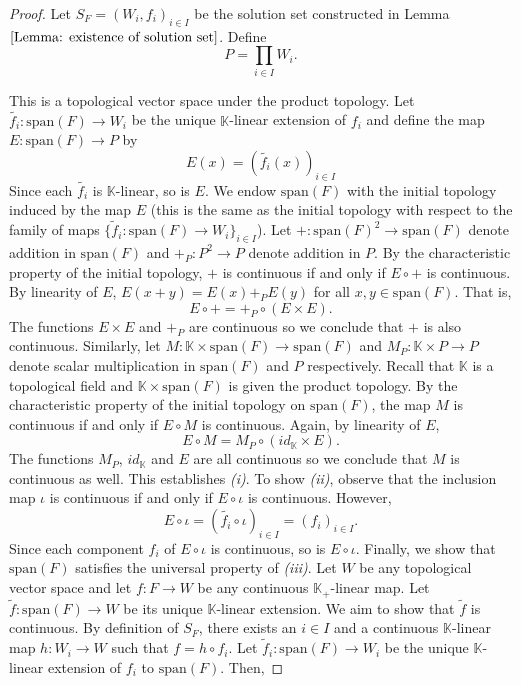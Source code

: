 \documentclass[a4paper,11pt]{article}
\numberwithin{equation}{section}
\theoremstyle{definition}
\theoremstyle{plain}
\newcommand{\spn}{\mathrm{span}}
\begin{document}
\begin{proof}
    Let $S_{F} = (W_{i}, f_{i})_{i \in I}$ be the solution set constructed in Lemma $\ref{Lemma: existence of solution set}$. Define 
    $$P = \prod_{i \in I}W_{i}.$$
   
   This is a topological vector space under the product topology. Let $\tilde{f_{i}}: \spn(F) \longrightarrow W_{i}$ be the unique $\mathbb{K}$-linear extension of $f_{i}$ and define the map $E: \spn(F) \longrightarrow P$ by
    $$E(x) = (\tilde{f_{i}}(x))_{i \in I}$$
    Since each $\tilde{f_{i}}$ is $\mathbb{K}$-linear, so is $E$. We endow $\spn(F)$ with the initial topology induced by the map $E$ (this is the same as the initial topology with respect to the family of maps $\{\tilde{f}_i: \spn(F) \to W_i\}_{i \in I}$). Let $+: \spn(F)^{2} \longrightarrow \spn(F)$ denote addition in $\spn(F)$ and $+_{P}: P^{2} \longrightarrow P$ denote addition in $P$. By the characteristic property of the initial topology, $+$ is continuous if and only if $E \circ +$ is continuous. By linearity of $E$, $E(x + y) = E(x) +_{P} E(y)$ for all $x, y \in \spn(F)$. That is,
    $$E \circ + = +_{P} \circ (E \times E).$$
    The functions $E \times E$ and $+_{P}$ are continuous so we conclude that $+$ is also continuous. Similarly, let $M: \mathbb{K} \times \spn(F) \longrightarrow \spn(F)$ and $M_{P}: \mathbb{K} \times P \longrightarrow P$ denote scalar multiplication in $\spn(F)$ and $P$ respectively. Recall that $\mathbb{K}$ is a topological field and $\mathbb{K} \times \spn(F)$ is given the product topology. By the characteristic property of the initial topology on $\spn(F)$, the map $M$ is continuous if and only if $E \circ M$ is continuous. Again, by linearity of $E$,
    $$E \circ M = M_{P} \circ (id_{\mathbb{K}} \times E).$$
    The functions $M_{P}$, $id_{\mathbb{K}}$ and $E$ are all continuous so we conclude that $M$ is continuous as well. This establishes \textit{(i)}. To show \textit{(ii)}, observe that the inclusion map $\iota$ is continuous if and only if $E \circ \iota$ is continuous. However,
    $$E \circ \iota = (\tilde{f_{i}} \circ \iota)_{i \in I} = (f_{i})_{i \in I}.$$
    Since each component $f_{i}$ of $E \circ \iota$ is continuous, so is $E \circ \iota$. Finally, we show that $\spn(F)$ satisfies the universal property of \textit{(iii)}. Let $W$ be any topological vector space and let $f: F \longrightarrow W$ be any continuous $\mathbb{K}_{+}$-linear map. Let $\tilde{f}: \spn(F) \longrightarrow W$ be its unique $\mathbb{K}$-linear extension. We aim to show that $\tilde{f}$ is continuous. By definition of $S_{F}$, there exists an $i \in I$ and a continuous $\mathbb{K}$-linear map $h: W_{i} \longrightarrow W$ such that $f = h \circ f_{i}$. Let $\tilde{f}_{i}: \spn(F) \longrightarrow W_{i}$ be the unique $\mathbb{K}$-linear extension of $f_{i}$ to $\spn(F)$. Then,

\end{proof}
\end{document}
